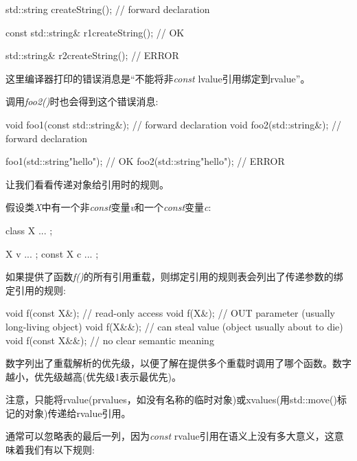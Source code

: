 \begin{codebox}[cpp]
std::string createString(); // forward declaration

const std::string& r1{createString()}; // OK

std::string& r2{createString()}; // ERROR
\end{codebox}

这里编译器打印的错误消息是“不能将非\textit{const} lvalue引用绑定到rvalue”。\par

调用\textit{foo2()}时也会得到这个错误消息:\par

\begin{codebox}[cpp]
void foo1(const std::string&); // forward declaration
void foo2(std::string&); // forward declaration

foo1(std::string{"hello"}); // OK
foo2(std::string{"hello"}); // ERROR
\end{codebox}


让我们看看传递对象给引用时的规则。\par

假设类\textit{X}中有一个非\textit{const}变量\textit{v}和一个\textit{const}变量\textit{c}:\par

\begin{codebox}[cpp]
class X {
  ...
};

X v{ ... };
const X c{ ... };
\end{codebox}

如果提供了函数\textit{f()}的所有引用重载，则绑定引用的规则表会列出了传递参数的绑定引用的规则:\par

\begin{codebox}[cpp]
void f(const X&); // read-only access
void f(X&); // OUT parameter (usually long-living object)
void f(X&&); // can steal value (object usually about to die)
void f(const X&&); // no clear semantic meaning
\end{codebox}

数字列出了重载解析的优先级，以便了解在提供多个重载时调用了哪个函数。数字越小，优先级越高(优先级1表示最优先)。\par

注意，只能将rvalue(prvalues，如没有名称的临时对象)或xvalues(用std::move()标记的对象)传递给rvalue引用。\par

通常可以忽略表的最后一列，因为\textit{const} rvalue引用在语义上没有多大意义，这意味着我们有以下规则:\par

